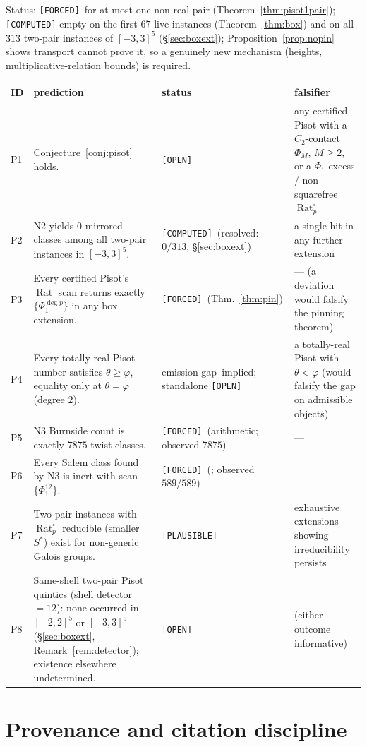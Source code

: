 \documentclass[11pt]{article}
\newcommand{\F}{\textnormal{\texttt{[FORCED]}}}
\newcommand{\C}{\textnormal{\texttt{[COMPUTED]}}}
\newcommand{\Pl}{\textnormal{\texttt{[PLAUSIBLE]}}}
\newcommand{\Op}{\textnormal{\texttt{[OPEN]}}}
\newcommand{\Rat}{\operatorname{Rat}}
\theoremstyle{definition}
\begin{document}
Status: \F\ for at most one non-real pair (Theorem~\ref{thm:pisot1pair});
\C-empty on the first $67$ live instances (Theorem~\ref{thm:box}) and on all
$313$ two-pair instances of $[-3,3]^5$ (\S\ref{sec:boxext});
Proposition~\ref{prop:nopin} shows transport cannot prove it, so a genuinely
new mechanism (heights, multiplicative-relation bounds) is required.

\begin{center}
\small
\begin{tabular}{p{0.6cm}p{8.2cm}p{2.4cm}p{3.6cm}}
\hline
ID & prediction & status & falsifier\\
\hline
P1 & Conjecture~\ref{conj:pisot} holds. & \Op & any certified Pisot with a
$C_2$-contact $\Phi_M$, $M\ge2$, or a $\Phi_1$ excess / non-squarefree
$\Rat_p^{\circ}$\\
P2 & N2 yields $0$ mirrored classes among all two-pair instances in
$[-3,3]^5$. & \C\ (resolved: $0/313$, \S\ref{sec:boxext}) & a single hit in
any further extension\\
P3 & Every certified Pisot's $\Rat$ scan returns exactly $\{\Phi_1^{\deg p}\}$
in any box extension. & \F\ (Thm.~\ref{thm:pin}) & --- (a deviation would
falsify the pinning theorem)\\
P4 & Every totally-real Pisot number satisfies $\theta\ge\varphi$, equality
only at $\theta=\varphi$ (degree $2$). & emission-gap--implied; standalone
\Op & a totally-real Pisot with $\theta<\varphi$ (would falsify the gap on
admissible objects)\\
P5 & N3 Burnside count is exactly $7875$ twist-classes. & \F\ (arithmetic;
observed $7875$) & ---\\
P6 & Every Salem class found by N3 is inert with scan $\{\Phi_1^{12}\}$.
& \F\ (\cite[Cor.~7.14]{relcharge}; observed $589/589$) & ---\\
P7 & Two-pair instances with $\Rat_p^{\circ}$ reducible (smaller $S^{*}$)
exist for non-generic Galois groups. & \Pl & exhaustive extensions showing
irreducibility persists\\
P8 & Same-shell two-pair Pisot quintics (shell detector $=12$): none occurred
in $[-2,2]^5$ or $[-3,3]^5$ (\S\ref{sec:boxext},
Remark~\ref{rem:detector}); existence elsewhere undetermined. & \Op & (either
outcome informative)\\
\hline
\end{tabular}
\end{center}

\section{Provenance and citation discipline}\label{sec:provenance}
\end{document}
